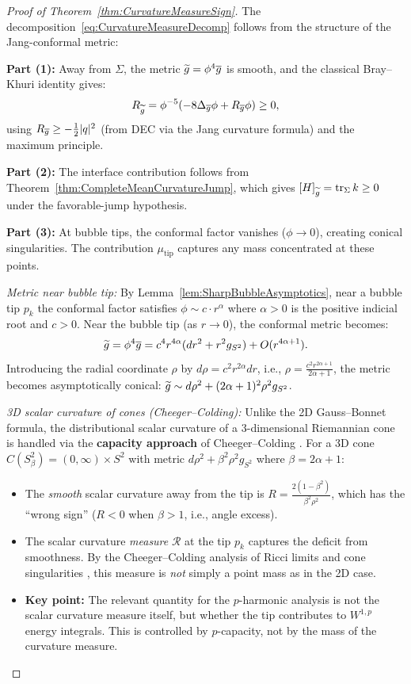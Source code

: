 \begin{proof}[Proof of Theorem~\ref{thm:CurvatureMeasureSign}]
The decomposition~\eqref{eq:CurvatureMeasureDecomp} follows from the structure of the Jang-conformal metric:

\textbf{Part (1):} Away from $\Sigma$, the metric $\widetilde{g} = \phi^4 \overline{g}$ is smooth, and the classical Bray--Khuri identity gives:
\begin{equation}
    R_{\widetilde{g}} = \phi^{-5}(-8\Delta_{\overline{g}}\phi + R_{\overline{g}}\phi) \ge 0,
\end{equation}
using $R_{\overline{g}} \ge -\frac{1}{2}|q|^2$ (from DEC via the Jang curvature formula) and the maximum principle.

\textbf{Part (2):} The interface contribution follows from Theorem~\ref{thm:CompleteMeanCurvatureJump}, which gives $[H]_{\widetilde{g}}=\operatorname{tr}_\Sigma k\ge0$ under the favorable-jump hypothesis.

\textbf{Part (3):} At bubble tips, the conformal factor vanishes ($\phi \to 0$), creating conical singularities. The contribution $\mu_{\mathrm{tip}}$ captures any mass concentrated at these points.

\textit{Metric near bubble tip:} By Lemma~\ref{lem:SharpBubbleAsymptotics}, near a bubble tip $p_k$ the conformal factor satisfies $\phi \sim c \cdot r^{\alpha}$ where $\alpha > 0$ is the positive indicial root and $c > 0$. Near the bubble tip (as $r \to 0$), the conformal metric becomes:
\begin{equation}
    \widetilde{g} = \phi^4 \overline{g} = c^4 r^{4\alpha}(dr^2 + r^2 g_{S^2}) + O(r^{4\alpha + 1}).
\end{equation}
Introducing the radial coordinate $\rho$ by $d\rho = c^2 r^{2\alpha} dr$, i.e., $\rho = \frac{c^2 r^{2\alpha+1}}{2\alpha + 1}$, the metric becomes asymptotically conical: $\widetilde{g} \sim d\rho^2 + (2\alpha+1)^2 \rho^2 g_{S^2}$.

\textit{3D scalar curvature of cones (Cheeger--Colding):} Unlike the 2D Gauss--Bonnet formula, the distributional scalar curvature of a 3-dimensional Riemannian cone is handled via the \textbf{capacity approach} of Cheeger--Colding \cite{cheegercolding1997}. For a 3D cone $C(S^2_\beta) = (0,\infty) \times S^2$ with metric $d\rho^2 + \beta^2 \rho^2 g_{S^2}$ where $\beta = 2\alpha + 1$:
\begin{itemize}
    \item The \emph{smooth} scalar curvature away from the tip is $R = \frac{2(1 - \beta^2)}{\beta^2 \rho^2}$, which has the ``wrong sign'' ($R < 0$ when $\beta > 1$, i.e., angle excess).
    \item The scalar curvature \emph{measure} $\mathcal{R}$ at the tip $p_k$ captures the deficit from smoothness. By the Cheeger--Colding analysis of Ricci limits and cone singularities \cite{cheegercolding1997}, this measure is \emph{not} simply a point mass as in the 2D case.
    \item \textbf{Key point:} The relevant quantity for the $p$-harmonic analysis is not the scalar curvature measure itself, but whether the tip contributes to $W^{1,p}$ energy integrals. This is controlled by $p$-capacity, not by the mass of the curvature measure.
\end{itemize}


\end{proof}
